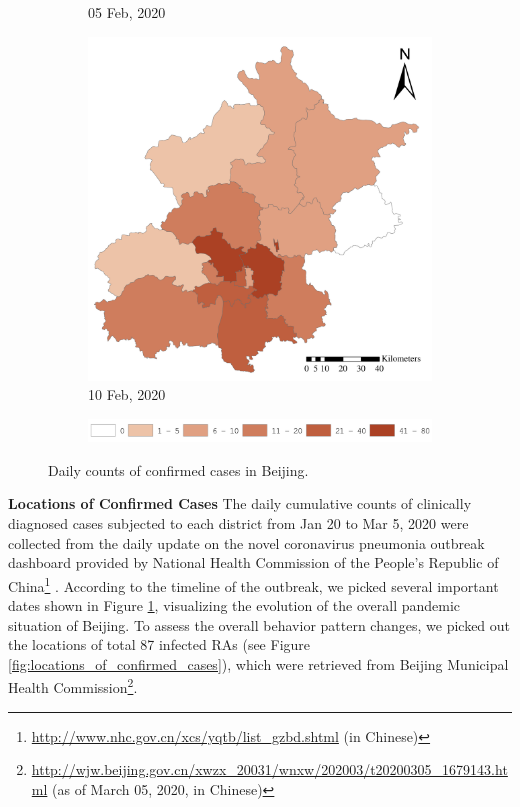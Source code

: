 \documentclass[ijgi,submit,moreauthors,pdftex]{Definitions/mdpi}
\begin{document}
\begin{figure}[ht]
\begin{subfigure}{.23\textwidth}
        \caption{05 Feb, 2020}
    \end{subfigure}
    \begin{subfigure}{.23\textwidth}
    	\includegraphics[width=\textwidth]{Figures/ConfirmedDistrictD2020_02_10-eps-converted-to.pdf}
        \caption{10 Feb, 2020}
    \end{subfigure}

    \vspace{6pt}
    \begin{subfigure}{0.7\textwidth}
        \includegraphics[width=\textwidth]{Figures/Fig2legend-eps-converted-to.pdf}
    \end{subfigure}
    \caption{Daily counts of confirmed cases in Beijing.}
    \label{fig:number_of_confirmed_cases}
\end{figure}

\textbf{Locations of Confirmed Cases}
The daily cumulative counts of clinically diagnosed cases subjected to each district from Jan 20 to Mar 5, 2020 were collected from the daily update on the novel coronavirus pneumonia outbreak dashboard provided by National Health Commission of the People's Republic of China\footnote{\url{http://www.nhc.gov.cn/xcs/yqtb/list_gzbd.shtml} (in Chinese)} .
According to the timeline \cite{li2020early} of the outbreak, we picked several important dates shown in Figure \ref{fig:number_of_confirmed_cases}, visualizing the evolution of the overall pandemic situation of Beijing.
To assess the overall behavior pattern changes, we picked out the locations of total 87 infected RAs (see Figure \ref{fig:locations_of_confirmed_cases}), which were retrieved from Beijing Municipal Health Commission\footnote{\url{http://wjw.beijing.gov.cn/xwzx_20031/wnxw/202003/t20200305_1679143.html} (as of March 05, 2020, in Chinese)}.
\end{document}

